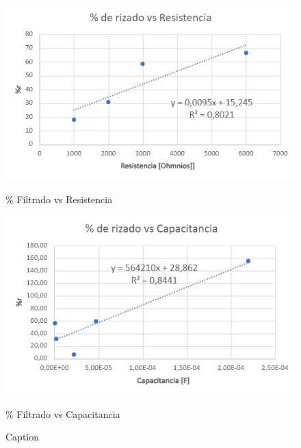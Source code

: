 \documentclass[10pt,letterpaper]{article}
\begin{document}
\begin{figure}[H]
    \centering
    \begin{minipage}[b]{0.45\textwidth}
        \centering
        \includegraphics[scale=0.65]{FiltradoResitencia_plt.png}
        \caption*{\% Filtrado vs Resistencia}
    \end{minipage}
            \begin{minipage}[b]{0.45\textwidth}
        \centering
        \includegraphics[scale=0.65]{FiltradoCapacitancia_plt.png}
        \caption*{\% Filtrado vs Capacitancia}
    \end{minipage}
    \caption{Caption}
    \label{fig:enter-label}
\end{figure}
\end{document}
